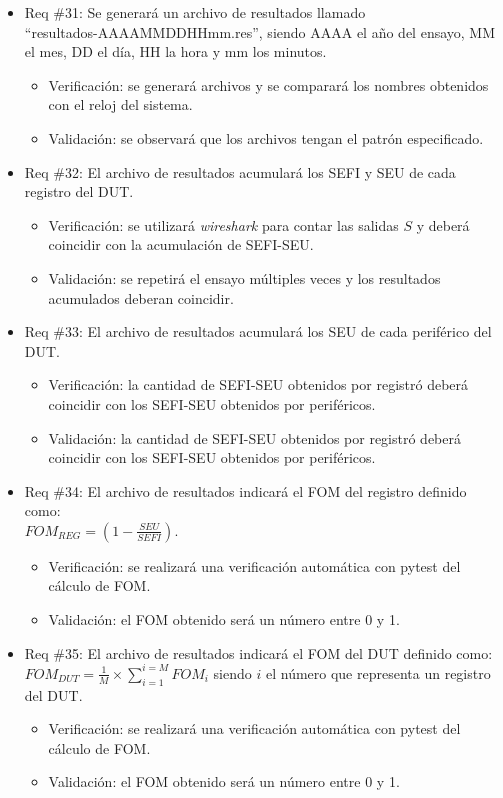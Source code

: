 \documentclass[
11pt, %
]{charter}
\begin{document}
\begin{itemize}
\item Req \#31: Se generará un archivo de resultados llamado\\ ``resultados-AAAAMMDDHHmm.res'', siendo AAAA el año del ensayo, MM el mes, DD el día, HH la hora y mm los minutos.
\begin{itemize}
    \item Verificación: se generará archivos y se comparará los nombres obtenidos con el reloj del sistema.
    \item Validación: se observará que los archivos tengan el patrón especificado.
\end{itemize}

\item Req \#32: El archivo de resultados acumulará los SEFI y SEU de cada registro del DUT.
\begin{itemize}
    \item Verificación: se utilizará \emph{wireshark} para contar las salidas $ S $ y deberá coincidir con la acumulación de SEFI-SEU.
    \item Validación: se repetirá el ensayo múltiples veces y los resultados acumulados deberan coincidir.
\end{itemize}

\item Req \#33: El archivo de resultados acumulará los SEU de cada periférico del DUT.
\begin{itemize}
    \item Verificación: la cantidad de SEFI-SEU obtenidos por registró deberá coincidir con los SEFI-SEU obtenidos por periféricos.
    \item Validación: la cantidad de SEFI-SEU obtenidos por registró deberá coincidir con los SEFI-SEU obtenidos por periféricos.
\end{itemize}

\item Req \#34: El archivo de resultados indicará el FOM del registro definido como: \\ $ FOM_{REG} = (1 - \frac{SEU}{SEFI}) $.
\begin{itemize}
    \item Verificación: se realizará una verificación automática con pytest del cálculo de FOM.
    \item Validación: el FOM obtenido será un número entre 0 y 1.
\end{itemize}

\item Req \#35: El archivo de resultados indicará el FOM del DUT definido como: \\ $ FOM_{DUT} = \frac{1}{M} \times \sum_{i = 1}^{i = M}FOM_{i} $ siendo $ i $ el número que representa un registro del DUT.
\begin{itemize}
    \item Verificación: se realizará una verificación automática con pytest del cálculo de FOM.
    \item Validación: el FOM obtenido será un número entre 0 y 1.
\end{itemize}


\end{itemize}
\end{document}
